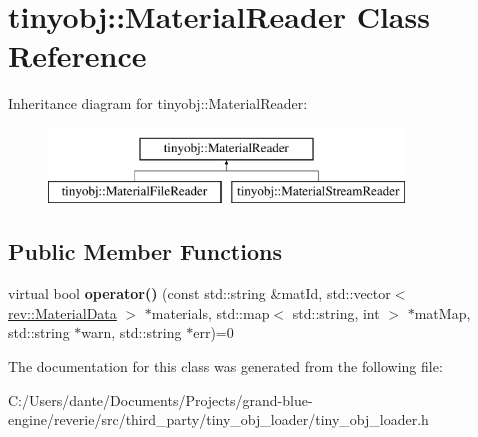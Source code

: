 \hypertarget{classtinyobj_1_1_material_reader}{}\section{tinyobj\+::Material\+Reader Class Reference}
\label{classtinyobj_1_1_material_reader}
Inheritance diagram for tinyobj\+::Material\+Reader\+:\begin{figure}[H]
\begin{center}
\leavevmode
\includegraphics[height=2.000000cm]{classtinyobj_1_1_material_reader}
\end{center}
\end{figure}
\subsection*{Public Member Functions}
\begin{DoxyCompactItemize}
\item 
\mbox{\label{classtinyobj_1_1_material_reader_a8297e12e55f8aa9a80bfc9e8fd8f047f}} 
virtual bool {\bfseries operator()} (const std\+::string \&mat\+Id, std\+::vector$<$ \mbox{\hyperlink{structrev_1_1_material_data}{rev\+::\+Material\+Data}} $>$ $\ast$materials, std\+::map$<$ std\+::string, int $>$ $\ast$mat\+Map, std\+::string $\ast$warn, std\+::string $\ast$err)=0
\end{DoxyCompactItemize}


The documentation for this class was generated from the following file\+:\begin{DoxyCompactItemize}
\item 
C\+:/\+Users/dante/\+Documents/\+Projects/grand-\/blue-\/engine/reverie/src/third\+\_\+party/tiny\+\_\+obj\+\_\+loader/tiny\+\_\+obj\+\_\+loader.\+h\end{DoxyCompactItemize}

